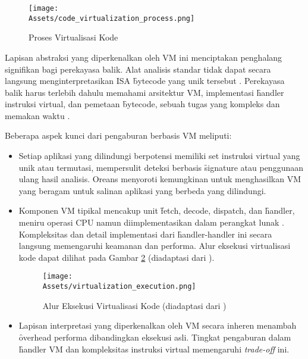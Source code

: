 \begin{figure}[H]
	\centering
	\texttt{[image: \\Assets/code\_virtualization\_process.png]} %
	\caption{Proses Virtualisasi Kode \cite{Ore06}}
	\label{fig:jurnal_ui_ana_virtualization_process} %
\end{figure}

Lapisan abstraksi yang diperkenalkan oleh VM ini menciptakan penghalang signifikan bagi perekayasa balik. Alat analisis standar tidak dapat secara langsung menginterpretasikan ISA \f{bytecode} yang unik tersebut \cite{Salwan2018SymbolicDeobfuscation}. Perekayasa balik harus terlebih dahulu memahami arsitektur VM, implementasi \f{handler} instruksi virtual, dan pemetaan \f{bytecode}, sebuah tugas yang kompleks dan memakan waktu \cite{Don20, Hac24}.

Beberapa aspek kunci dari pengaburan berbasis VM meliputi:
\begin{itemize}
    \item {} Setiap aplikasi yang dilindungi berpotensi memiliki set instruksi virtual yang unik atau termutasi, mempersulit deteksi berbasis \f{signature} atau penggunaan ulang hasil analisis. Oreans \cite{Ore06} menyoroti kemungkinan untuk menghasilkan VM yang beragam untuk salinan aplikasi yang berbeda yang dilindungi.
    \item {} Komponen VM tipikal mencakup unit \f{fetch, decode, dispatch}, dan \f{handler}, meniru operasi CPU namun diimplementasikan dalam perangkat lunak \cite{Salwan2018SymbolicDeobfuscation, Hac24}. Kompleksitas dan detail implementasi dari \f{handler-handler} ini secara langsung memengaruhi keamanan dan performa. Alur eksekusi virtualisasi kode dapat dilihat pada Gambar \ref{fig:jurnal_ui_ana_execution_virtualization} (diadaptasi dari \cite{Don20}).

    \begin{figure}[H]
        \centering
        \texttt{[image: \\Assets/virtualization\_execution.png]}
        \caption{Alur Eksekusi Virtualisasi Kode (diadaptasi dari \cite{Don20})}
        \label{fig:jurnal_ui_ana_execution_virtualization}
    \end{figure}

    \item {} Lapisan interpretasi yang diperkenalkan oleh VM secara inheren menambah \f{overhead} performa dibandingkan eksekusi asli. Tingkat pengaburan dalam \f{handler} VM dan kompleksitas instruksi virtual memengaruhi \textit{trade-off} ini.
\end{itemize}

